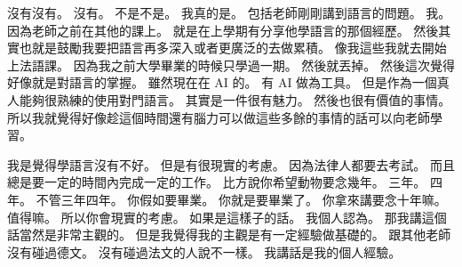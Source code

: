\hypertarget{w01:cue:3939}{}沒有沒有。
\hypertarget{w01:cue:3940}{}沒有。
\hypertarget{w01:cue:3941}{}不是不是。
\hypertarget{w01:cue:3942}{}我真的是。
\hypertarget{w01:cue:3943}{}包括老師剛剛講到語言的問題。
\hypertarget{w01:cue:3944}{}我。
\hypertarget{w01:cue:3945}{}因為老師之前在其他的課上。
\hypertarget{w01:cue:3946}{}就是在上學期有分享他學語言的那個經歷。
\hypertarget{w01:cue:3947}{}然後其實也就是鼓勵我要把語言再多深入或者更廣泛的去做累積。
\hypertarget{w01:cue:3948}{}像我這些我就去開始上法語課。
\hypertarget{w01:cue:3949}{}因為我之前大學畢業的時候只學過一期。
\hypertarget{w01:cue:3950}{}然後就丟掉。
\hypertarget{w01:cue:3951}{}然後這次覺得好像就是對語言的掌握。
\hypertarget{w01:cue:3952}{}雖然現在在 AI 的。
\hypertarget{w01:cue:3953}{}有 AI 做為工具。
\hypertarget{w01:cue:3954}{}但是作為一個真人能夠很熟練的使用對門語言。
\hypertarget{w01:cue:3955}{}其實是一件很有魅力。
\hypertarget{w01:cue:3956}{}然後也很有價值的事情。
\hypertarget{w01:cue:3957}{}所以我就覺得好像趁這個時間還有腦力可以做這些多餘的事情的話可以向老師學習。

\hypertarget{w01:cue:3958}{}我是覺得學語言沒有不好。
\hypertarget{w01:cue:3959}{}但是有很現實的考慮。
\hypertarget{w01:cue:3960}{}因為法律人都要去考試。
\hypertarget{w01:cue:3961}{}而且總是要一定的時間內完成一定的工作。
\hypertarget{w01:cue:3962}{}比方說你希望動物要念幾年。
\hypertarget{w01:cue:3963}{}三年。
\hypertarget{w01:cue:3964}{}四年。
\hypertarget{w01:cue:3965}{}不管三年四年。
\hypertarget{w01:cue:3966}{}你假如要畢業。
\hypertarget{w01:cue:3967}{}你就是要畢業了。
\hypertarget{w01:cue:3968}{}你拿來講要念十年嘛。
\hypertarget{w01:cue:3969}{}值得嘛。
\hypertarget{w01:cue:3970}{}所以你會現實的考慮。
\hypertarget{w01:cue:3971}{}如果是這樣子的話。
\hypertarget{w01:cue:3972}{}我個人認為。
\hypertarget{w01:cue:3973}{}那我講這個話當然是非常主觀的。
\hypertarget{w01:cue:3974}{}但是我覺得我的主觀是有一定經驗做基礎的。
\hypertarget{w01:cue:3975}{}跟其他老師沒有碰過德文。
\hypertarget{w01:cue:3976}{}沒有碰過法文的人說不一樣。
\hypertarget{w01:cue:3977}{}我講話是我的個人經驗。

